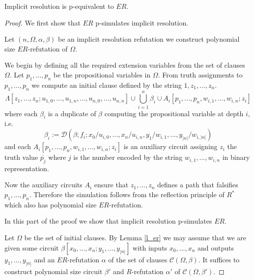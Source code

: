 \documentclass{LMCS}
\theoremstyle{plain}\newtheorem{satz}[thm]{Satz}
\begin{document}
\begin{thm}
\label{t_main}
Implicit resolution is p-equivalent to $ER$.
\begin{proof}
We first show that $ER$ p-simulates implicit resolution.

Let $(n, \Omega, \alpha,\beta)$ be an implicit resolution refutation we construct polynomial size $ER$-refutation of $\Omega$.

We begin by defining all the required extension variables from the set of clauses $\Omega$. Let $p_1,...,p_n$ be the propositional variables in $\Omega$. From truth assignments to $p_1,...,p_n$ we compute an initial clause defined by the string $1,z_1,...,z_n$.
\[\Lambda[z_1,...,z_n;u_{1,0},...,u_{1,n},...,u_{n,0},...,u_{n,n}] \cup \displaystyle{\bigcup_{i=1}^n \beta_i} \cup A_i [p_1,...,p_n,w_{i,1},...,w_{i,n};z_i]
\]
where each $\beta_i$ is a duplicate of $\beta$ computing the propositional variable at depth $i$, i.e.
\[\beta_i := {\mathcal D}(\beta;f_i;x_0/u_{i,0},...,x_n/u_{i,n},y_1/w_{i,1},...,y_{|n|}/w_{i,|n|})
\]
and each $A_i [p_1,...,p_n,w_{i,1},...,w_{i,n};z_i]$ is an auxiliary circuit assigning $z_i$ the truth value $\overline{p_j}$ where $j$ is the number encoded by the string $w_{i,1},...,w_{i,n}$ in binary representation.

Now the auxiliary circuits $A_i$ ensure that $z_1,...,z_n$ defines a path that falsifies $p_1,...,p_n$.
Therefore the simulation follows from the reflection principle of $R^*$ which also has polynomial size $ER$-refutation.

In this part of the proof we show that implicit resolution p-simulates $ER$.

Let $\Omega$ be the set of initial clauses. By Lemma \ref{l_er} we may assume that we are given some circuit $\beta[x_0,...,x_n;y_1,...,y_{|n|}]$ with inputs $x_0,...,x_n$ and outputs $y_1,...,y_{|n|}$ and an $ER$-refutation $\alpha$ of the set of clauses ${\mathcal C}(\Omega, \beta)$. It suffices to construct polynomial size circuit $\beta'$ and $R$-refutation $\alpha'$ of ${\mathcal C}(\Omega, \beta')$.


\end{proof}
\end{thm}
\end{document}
